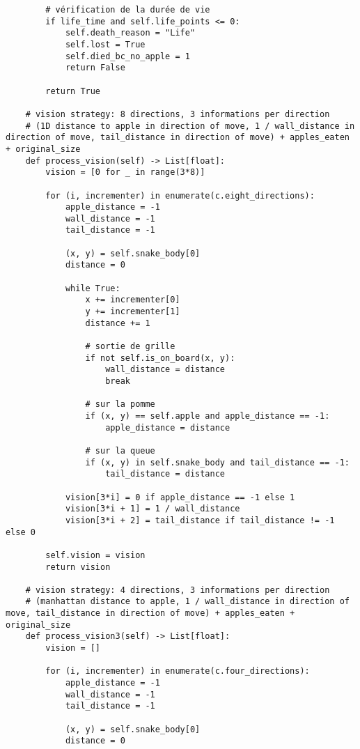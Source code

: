 \documentclass[11pt,a4paper]{article}
\begin{document}
\begin{verbatim}
        # vérification de la durée de vie
        if life_time and self.life_points <= 0:
            self.death_reason = "Life"
            self.lost = True
            self.died_bc_no_apple = 1
            return False

        return True

    # vision strategy: 8 directions, 3 informations per direction
    # (1D distance to apple in direction of move, 1 / wall_distance in direction of move, tail_distance in direction of move) + apples_eaten + original_size
    def process_vision(self) -> List[float]:
        vision = [0 for _ in range(3*8)]

        for (i, incrementer) in enumerate(c.eight_directions):
            apple_distance = -1
            wall_distance = -1
            tail_distance = -1

            (x, y) = self.snake_body[0]
            distance = 0

            while True:
                x += incrementer[0]
                y += incrementer[1]
                distance += 1

                # sortie de grille
                if not self.is_on_board(x, y):
                    wall_distance = distance
                    break

                # sur la pomme
                if (x, y) == self.apple and apple_distance == -1:
                    apple_distance = distance

                # sur la queue
                if (x, y) in self.snake_body and tail_distance == -1:
                    tail_distance = distance

            vision[3*i] = 0 if apple_distance == -1 else 1
            vision[3*i + 1] = 1 / wall_distance
            vision[3*i + 2] = tail_distance if tail_distance != -1 else 0

        self.vision = vision
        return vision

    # vision strategy: 4 directions, 3 informations per direction
    # (manhattan distance to apple, 1 / wall_distance in direction of move, tail_distance in direction of move) + apples_eaten + original_size
    def process_vision3(self) -> List[float]:
        vision = []

        for (i, incrementer) in enumerate(c.four_directions):
            apple_distance = -1
            wall_distance = -1
            tail_distance = -1

            (x, y) = self.snake_body[0]
            distance = 0


\end{verbatim}
\end{document}
